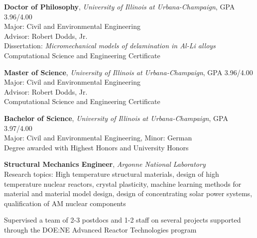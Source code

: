 \documentclass[english]{xetexCV}
\begin{document}






\makecvtitle


\textbf{Doctor of Philosophy}, \emph{University of Illinois at Urbana-Champaign},
GPA 3.96/4.00\\
Major: Civil and Environmental Engineering\\
Advisor: Robert Dodds, Jr. \\
Dissertation: \textit{Micromechanical models of delamination in Al-Li
alloys}\\
Computational Science and Engineering Certificate

\textbf{Master of Science}, \emph{University of Illinois at Urbana-Champaign},
GPA 3.96/4.00 \\
Major: Civil and Environmental Engineering\\
Advisor: Robert Dodds, Jr. \\
Computational Science and Engineering Certificate

\textbf{Bachelor of Science}, \emph{University of Illinois at Urbana-Champaign},
GPA 3.97/4.00 \\
Major: Civil and Environmental Engineering, Minor: German\\
Degree awarded with Highest Honors and University Honors 


\textbf{Structural Mechanics Engineer}, \emph{Argonne National Laboratory}
\\
Research topics: High temperature structural materials, design
of high temperature nuclear reactors, crystal plasticity, machine learning
methods for material and material model design, design of concentrating
solar power systems, qualification of AM nuclear components

Supervised a team of 2-3 postdocs and 1-2 staff on several projects
supported through the DOE:NE Advanced Reactor Technologies program
\end{document}

